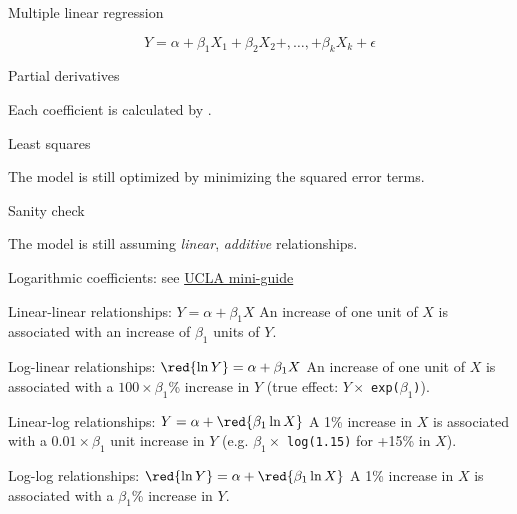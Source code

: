 \documentclass[t]{beamer}
\begin{document}
	\begin{frame}[c]{Multiple linear regression}
		
		$$Y = \alpha+\beta_1 X_1+\beta_2 X_2+,\ldots,+\beta_k X_k+\epsilon$$
		
		\vfill
		 
		\begin{block}{Partial derivatives}

			Each coefficient is calculated by .

		\end{block}

		\begin{block}{Least squares}

			The model is still optimized by minimizing the squared error terms.

		\end{block}

		\begin{alertblock}{Sanity check}

			The model is still assuming \emph{linear}, \emph{additive} relationships.

		\end{alertblock}
				
	\end{frame}


	\begin{frame}[c]{Logarithmic coefficients: see \href{http://www.ats.ucla.edu/stat/mult_pkg/faq/general/log_transformed_regression.htm}{UCLA mini-guide}}
	
		\begin{block}{Linear-linear relationships: $Y = \alpha + \beta_1 X$}
			An increase of one unit of $X$ is associated with an increase of $\beta_1$ units of $Y$.
		\end{block}
	
		\begin{block}{Log-linear relationships: $\red{\ln Y} = \alpha + \beta_1 X$}
			An increase of one unit of $X$ is associated with a $100 \times \beta_1$\% increase in $Y$ (true effect: $Y \times$ \texttt{exp($\beta_1$)}).
		\end{block}

		\begin{block}{Linear-log relationships: $Y = \alpha + \red{\beta_1 \ln X}$}
			A 1\% increase in $X$ is associated with a $0.01 \times \beta_1$ unit increase in $Y$ (e.g. $\beta_1 \times$ \texttt{log(1.15)} for +15\% in $X$).
		\end{block}
	
		\begin{block}{Log-log relationships: $\red{\ln Y} = \alpha + \red{\beta_1 \ln X}$}
			A 1\% increase in $X$ is associated with a $\beta_1$\% increase in $Y$.
		\end{block}
	
	\end{frame}
	
\end{document}
